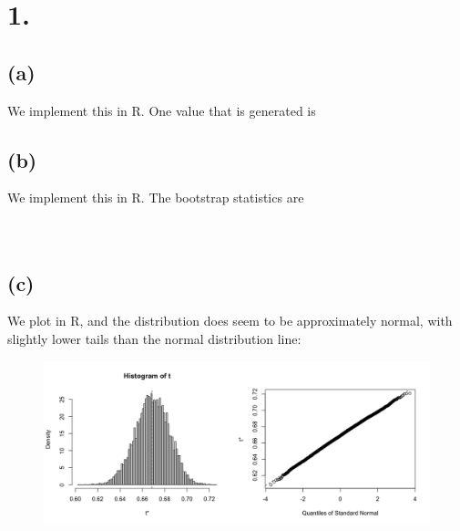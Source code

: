 \documentclass{article}
\begin{document}
\thispagestyle{firstpageheader}

\section*{1.}
{\Large 



\subsection*{(a)}

We implement this in R. One value that is generated is \\

\subsection*{(b)}

We implement this in R. The bootstrap statistics are \\
 \\
 \\

\subsection*{(c)}

We plot in R, and the distribution does seem to be approximately normal, with slightly lower tails than the normal distribution line:
\begin{figure}[h!]
  \centering
  \includegraphics[width=500pt]{hw6_1c.png}
\end{figure}

}
\end{document}

